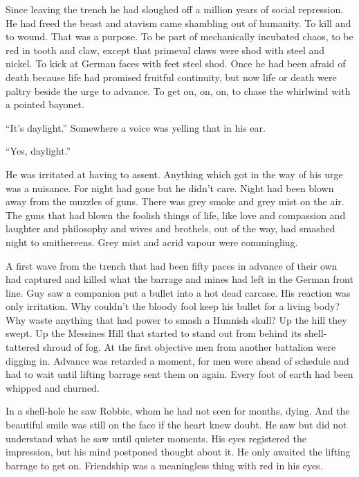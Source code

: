 Since leaving the trench he had sloughed off a million years of social repression. He had freed the beast and atavism came shambling out of humanity. To kill and to wound. That was a purpose. To be part of mechanically incubated chaos, to be red in tooth and claw, except that primeval claws were shod with steel and nickel. To kick at German faces with feet steel shod. Once he had been afraid of death because life had promised fruitful continuity, but now life or death were paltry beside the urge to advance. To get on, on, on, to chase the whirlwind with a pointed bayonet.

``It's daylight.'' Somewhere a voice was yelling that in his ear.

``Yes, daylight.''

He was irritated at having to assent. Anything which got in the way of his urge was a nuisance. For night had gone but he didn't care. Night had been blown away from the muzzles of guns. There was grey smoke and grey mist on the air. The guns that had blown the foolish things of life, like love and compassion and laughter and philosophy and wives and brothels, out of the way, had smashed night to smithereens. Grey mist and acrid vapour were commingling.

A first wave from the trench that had been fifty paces in advance of their own had captured and killed what the barrage and mines had left in the German front line. Guy saw a companion put a bullet into a hot dead carcase. His reaction was only irritation. Why couldn't the bloody fool keep his bullet for a living body? Why waste anything that had power to smash a Hunnish skull? Up the hill they swept. Up the Messines Hill that started to stand out from behind its shell-tattered shroud of fog. At the first objective men from another battalion were digging in. Advance was retarded a moment, for men were ahead of schedule and had to wait until lifting barrage sent them on again. Every foot of earth had been whipped and churned.

In a shell-hole he saw Robbie, whom he had not seen for months, dying. And the beautiful smile was still on the face if the heart knew doubt. He saw but did not understand what he saw until quieter moments. His eyes registered the impression, but his mind postponed thought about it. He only awaited the lifting barrage to get on. Friendship was a meaningless thing with red in his eyes.

